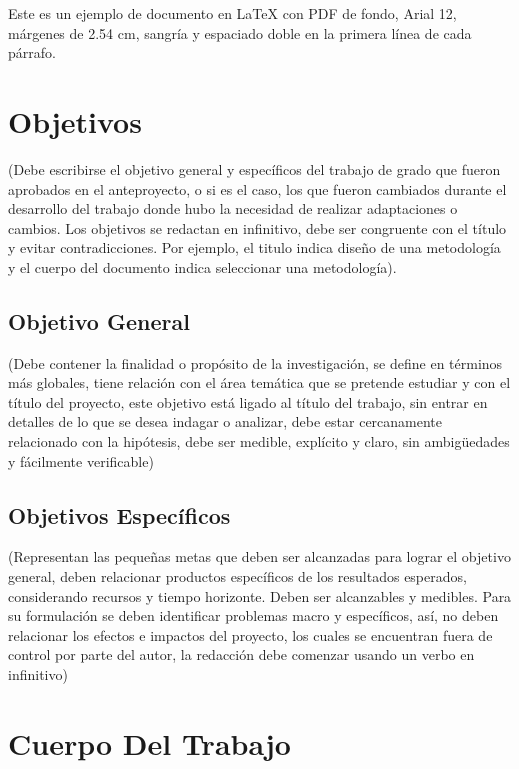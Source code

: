 \documentclass[11pt,openany]{book}
\begin{document}
Este es un ejemplo de documento en LaTeX con PDF de fondo, Arial 12, márgenes de 2.54 cm, sangría y espaciado doble en la primera línea de cada párrafo.

\lipsum[1-5]

\newpage

\pagestyle{plain}

\chapter{Objetivos}

(Debe escribirse el objetivo general y específicos del trabajo de grado que fueron aprobados en el anteproyecto, o si es el caso, los que fueron cambiados durante el desarrollo del trabajo donde hubo la necesidad de realizar adaptaciones o cambios. Los objetivos se redactan en infinitivo, debe ser congruente con el título y evitar contradicciones. Por ejemplo, el titulo indica diseño de una metodología y el cuerpo del documento indica seleccionar una metodología).

\section{Objetivo General}

(Debe contener la finalidad o propósito de la investigación, se define en términos más globales, tiene relación con el área temática que se pretende estudiar y con el título del proyecto, este objetivo está ligado al título del trabajo, sin entrar en detalles de lo que se desea indagar o analizar, debe estar cercanamente relacionado con la hipótesis, debe ser medible, explícito y claro, sin ambigüedades y fácilmente verificable)

\section{Objetivos Específicos}

(Representan las pequeñas metas que deben ser alcanzadas para lograr el objetivo general, deben relacionar productos específicos de los resultados esperados, considerando recursos y tiempo horizonte. Deben ser alcanzables y medibles. Para su formulación se deben identificar problemas macro y específicos, así, no deben relacionar los efectos e impactos del proyecto, los cuales se encuentran fuera de control por parte del autor, la redacción debe comenzar usando un verbo en infinitivo)

\chapter{Cuerpo Del Trabajo}
\end{document}
